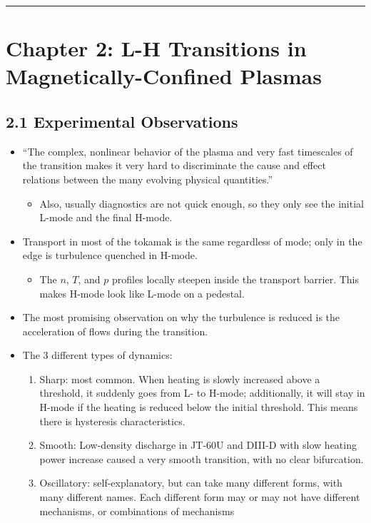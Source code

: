 \documentclass[a4paper]{article}
\begin{document}
\begin{center}\rule{3in}{0.4pt}\end{center}

\section{Chapter 2: L-H Transitions in Magnetically-Confined
Plasmas}\label{chapter-2-l-h-transitions-in-magnetically-confined-plasmas}

\subsection{2.1 Experimental
Observations}\label{experimental-observations}

\begin{itemize}
\item
  ``The complex, nonlinear behavior of the plasma and very fast
  timescales of the transition makes it very hard to discriminate the
  cause and effect relations between the many evolving physical
  quantities.''

  \begin{itemize}
  \itemsep1pt\parskip0pt
  \item
    Also, usually diagnostics are not quick enough, so they only see the
    initial L-mode and the final H-mode.
  \end{itemize}
\item
  Transport in most of the tokamak is the same regardless of mode; only
  in the edge is turbulence quenched in H-mode.

  \begin{itemize}
  \itemsep1pt\parskip0pt
  \item
    The $n$, $T$, and $p$ profiles locally steepen inside the transport
    barrier. This makes H-mode look like L-mode on a pedestal.
  \end{itemize}
\item
  The most promising observation on why the turbulence is reduced is the
  acceleration of flows during the transition.
\item
  The 3 different types of dynamics:

  \begin{enumerate}
  \def\labelenumi{\arabic{enumi}.}
  \item
    Sharp: most common. When heating is slowly increased above a
    threshold, it suddenly goes from L- to H-mode; additionally, it will
    stay in H-mode if the heating is reduced below the initial
    threshold. This means there is hysteresis characteristics.
  \item
    Smooth: Low-density discharge in JT-60U and DIII-D with slow heating
    power increase caused a very smooth transition, with no clear
    bifurcation.
  \item
    Oscillatory: self-explanatory, but can take many different forms,
    with many different names. Each different form may or may not have
    different mechanisms, or combinations of mechanisms
  \end{enumerate}
\end{itemize}
\end{document}
